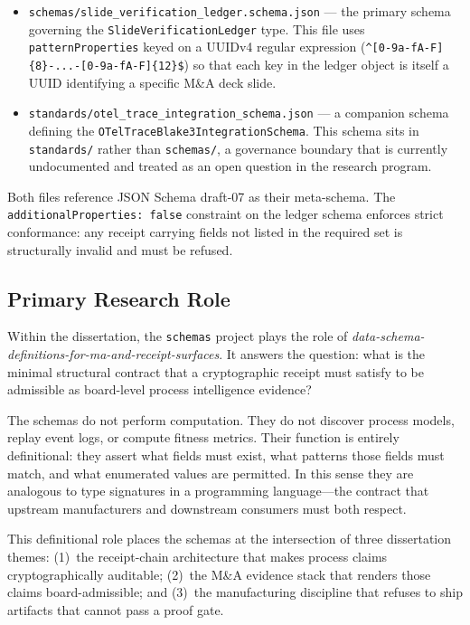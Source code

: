 \begin{itemize}
  \item \texttt{schemas/slide\_verification\_ledger.schema.json} --- the primary schema governing
    the \texttt{SlideVerificationLedger} type. This file uses \texttt{patternProperties} keyed on
    a UUIDv4 regular expression (\verb|^[0-9a-fA-F]{8}-...-[0-9a-fA-F]{12}$|) so that each
    key in the ledger object is itself a UUID identifying a specific M\&A deck slide.
  \item \texttt{standards/otel\_trace\_integration\_schema.json} --- a companion schema defining
    the \texttt{OTelTraceBlake3IntegrationSchema}. This schema sits in \texttt{standards/} rather
    than \texttt{schemas/}, a governance boundary that is currently undocumented and treated as
    an open question in the research program.
\end{itemize}

Both files reference JSON Schema draft-07 as their meta-schema. The \texttt{additionalProperties: false}
constraint on the ledger schema enforces strict conformance: any receipt carrying fields not listed
in the required set is structurally invalid and must be refused.

\subsection{Primary Research Role}
\label{sec:schemas-identity-role}

Within the dissertation, the \texttt{schemas} project plays the role of
\emph{data-schema-definitions-for-ma-and-receipt-surfaces}. It answers the question: what is the
minimal structural contract that a cryptographic receipt must satisfy to be admissible as
board-level process intelligence evidence?

The schemas do not perform computation. They do not discover process models, replay event logs, or
compute fitness metrics. Their function is entirely definitional: they assert what fields must
exist, what patterns those fields must match, and what enumerated values are permitted. In this
sense they are analogous to type signatures in a programming language---the contract that upstream
manufacturers and downstream consumers must both respect.

This definitional role places the schemas at the intersection of three dissertation themes:
(1)~the receipt-chain architecture that makes process claims cryptographically auditable;
(2)~the M\&A evidence stack that renders those claims board-admissible; and
(3)~the manufacturing discipline that refuses to ship artifacts that cannot pass a proof gate.

